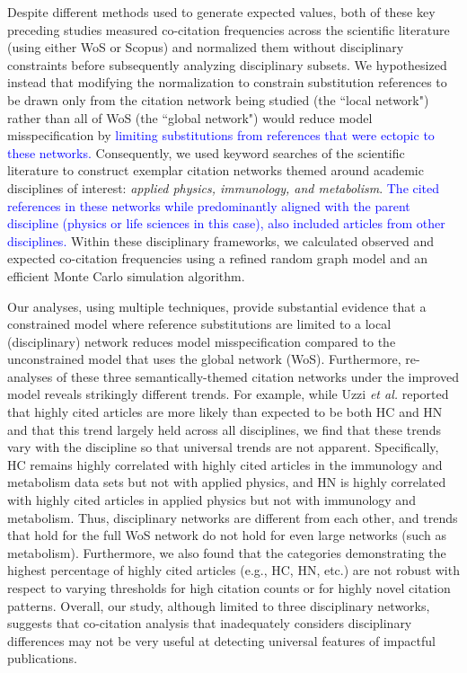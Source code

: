 \documentclass[NETN]{stjour}
\begin{document}
Despite different methods used to generate expected values, both of these key preceding studies measured co-citation frequencies across the scientific literature (using either WoS or Scopus) and normalized them without disciplinary constraints before subsequently analyzing disciplinary subsets. We hypothesized instead that modifying the normalization to constrain substitution references to be drawn only from the citation network being studied (the ``local network") rather than all of WoS
(the ``global network") would reduce model misspecification by \textcolor{blue}{limiting substitutions from references that were ectopic to these networks.} Consequently, we used keyword searches of the scientific literature to construct exemplar citation networks themed around academic disciplines of interest: \emph{applied physics, immunology, and metabolism}. \textcolor{blue}{The cited references in these networks while predominantly aligned with the parent discipline (physics or life sciences in this case), also included articles from other disciplines.} Within these disciplinary frameworks, we calculated observed and expected co-citation frequencies using a refined random graph model and an efficient Monte Carlo simulation algorithm.

Our analyses, using multiple techniques, provide substantial evidence that a constrained model where reference substitutions are limited to a local (disciplinary) network reduces model misspecification compared to the unconstrained model that uses the global network (WoS). Furthermore, re-analyses of these three semantically-themed citation networks  under the improved model reveals strikingly different trends. For example, while Uzzi {\em et al.} reported that highly cited articles are more likely than expected to be both HC and HN and that this trend largely held across all disciplines, we find that these trends vary with the discipline so that universal trends are not apparent. Specifically,  HC remains highly correlated with highly cited articles in the immunology and metabolism data sets but not with applied physics, and HN is highly correlated with highly cited articles in applied physics but not with immunology and metabolism.  Thus, disciplinary networks are different from each other, and trends that hold for the full WoS network do not hold for even large networks (such as metabolism).  Furthermore, we also found that the categories  demonstrating the highest percentage of highly cited articles (e.g., HC, HN, etc.) are not robust with respect to varying thresholds for high citation counts or for highly novel citation patterns. Overall, our study, although limited to three disciplinary networks, suggests that co-citation analysis that inadequately considers disciplinary differences may not be very useful at detecting universal features of impactful publications.
\end{document}
